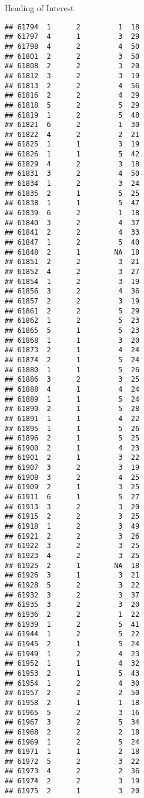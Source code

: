 \documentclass[
  ignorenonframetext,
]{beamer}
\begin{document}
\begin{frame}[fragile]{Heading of Interest}
\begin{verbatim}
## 61794  1      2         1  18
## 61797  4      1         3  29
## 61798  4      2         4  50
## 61801  2      2         3  50
## 61808  2      2         3  20
## 61812  3      2         3  19
## 61813  2      2         4  56
## 61816  2      2         4  29
## 61818  5      2         5  29
## 61819  1      2         5  48
## 61821  6      2         1  30
## 61822  4      2         2  21
## 61825  1      1         3  19
## 61826  1      1         5  42
## 61829  4      2         3  18
## 61831  3      2         4  50
## 61834  1      2         3  24
## 61835  2      1         5  25
## 61838  1      1         5  47
## 61839  6      2         1  18
## 61840  3      2         4  37
## 61841  2      2         4  33
## 61847  1      2         5  40
## 61848  2      1        NA  18
## 61851  2      2         3  21
## 61852  4      2         3  27
## 61854  1      2         3  19
## 61856  3      2         4  36
## 61857  2      2         3  19
## 61861  2      2         5  29
## 61862  1      2         5  23
## 61865  5      1         5  23
## 61868  1      1         3  20
## 61873  2      1         4  24
## 61874  2      1         5  24
## 61880  1      1         5  26
## 61886  3      2         3  25
## 61888  4      1         4  24
## 61889  1      1         5  24
## 61890  2      1         5  28
## 61891  1      1         4  22
## 61895  1      1         5  26
## 61896  2      1         5  25
## 61900  2      1         4  23
## 61901  2      1         3  22
## 61907  3      2         3  19
## 61908  3      2         4  25
## 61909  2      1         3  25
## 61911  6      1         5  27
## 61913  3      2         3  20
## 61915  2      2         3  25
## 61918  1      2         3  49
## 61921  2      2         3  26
## 61922  3      2         3  25
## 61923  4      2         3  25
## 61925  2      1        NA  18
## 61926  3      1         3  21
## 61928  5      2         3  22
## 61932  3      2         3  37
## 61935  3      2         3  20
## 61936  2      2         1  22
## 61939  1      2         5  41
## 61944  1      2         5  22
## 61945  2      1         5  24
## 61949  1      2         4  23
## 61952  1      1         4  32
## 61953  2      1         5  43
## 61954  1      2         4  30
## 61957  2      2         2  50
## 61958  2      1         1  18
## 61965  5      2         3  16
## 61967  3      2         5  34
## 61968  2      2         2  18
## 61969  1      2         5  24
## 61971  1      1         2  18
## 61972  5      2         3  22
## 61973  4      2         2  36
## 61974  2      2         3  19
## 61975  2      1         3  20

\end{verbatim}
\end{frame}
\end{document}
